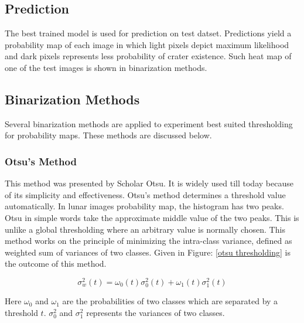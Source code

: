 \documentclass[11pt]{article}
\begin{document}
\subsection{Prediction}
The best trained model is used for prediction on test datset. Predictions yield a probability map of each image in which light pixels depict maximum likelihood and dark pixels represents less probability of crater existence. Such heat map of one of the test images is shown in binarization methods.


\subsection{Binarization Methods}
Several binarization methods are applied to experiment best suited thresholding for probability maps. These methods are discussed below.

\subsubsection{Otsu's Method}
This method was presented by Scholar Otsu. It is widely used till today because of its simplicity and effectiveness. Otsu's method determines a threshold value automatically. In lunar images probability map, the histogram has two peaks. Otsu in simple words take the approximate middle value of the two peaks. This is unlike a global thresholding where an arbitrary value is normally chosen. This method works on the principle of minimizing the intra-class variance, defined as weighted sum of variances of two classes. Given in Figure: \ref{otsu thresholding} is the outcome of this method.

\begin{equation}
\sigma_{w}^{2}(t)=\omega_{0}(t) \sigma_{0}^{2}(t)+\omega_{1}(t) \sigma_{1}^{2}(t)
\end{equation}

Here $\omega_{0}$ and $\omega_{1}$ are the probabilities of two classes which are separated by a threshold $t$. $\sigma_{0}^{2}$ and $\sigma_{1}^{2}$ represents the variances of two classes.
\end{document}
